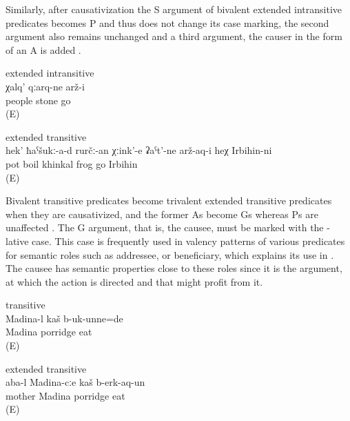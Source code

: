 Similarly, after causativization the S argument of bivalent extended intransitive predicates  becomes P and thus does not change its case marking, the second argument also remains unchanged and a third argument, the causer in the form of an  A is added . 
%
\begin{exe}

	\ex	\label{ex:The people turned into stones2} extended intransitive\\
	\gll	χalq'	qːarq-ne	arž-i\\
		people	stone	go\\
	\glt	{} (E)

	\ex	\label{ex:‎‎‎Irbihin turned the khinkal that was boiling in the pot into frogs} extended transitive\\
	\gll	hek'	ħaˁšukː-a-d	rurčː-an	χːink'-e	ʡaˁt'-ne	arž-aq-i	heχ	Irbihin-ni\\
			pot	boil	khinkal\tsc{-pl}	frog	go		Irbihin\\
	\glt	{} (E)
\end{exe}

Bivalent transitive predicates become trivalent extended transitive predicates when they are causativized, and the former As become Gs whereas Ps are unaffected . The G argument, that is, the causee, must be marked with the -lative case. This case is frequently used in valency patterns of various predicates for semantic roles such as addressee,  or beneficiary, which explains its use in . The causee has semantic properties close to these roles since it is the argument, at which the action is directed and that might profit from it. 
%
\begin{exe}
	\ex	\label{ex:Madina, mother, and the porridge}
	\begin{xlist}
		\ex	\label{ex:Madina was eating porridge} transitive \\
		\gll	Madina-l	kaš	b-uk-unne=de\\
			Madina	porridge	eat\\
		\glt	{} (E)

		\ex	\label{ex:Mother made Madina eat porridge} extended transitive \\
		\gll	aba-l	Madina-cːe	kaš	b-erk-aq-un\\
			mother	Madina	porridge	eat\\
		\glt	{} (E)
	\end{xlist}
\end{exe}




